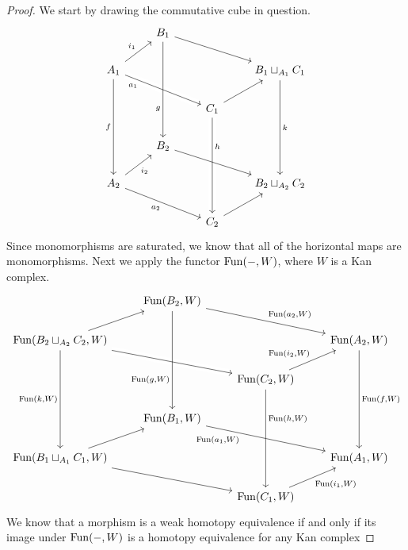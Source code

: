 \documentclass[a4paper,11pt,openany]{scrartcl}
\begin{document}
~\\
\begin{proof}
    We start by drawing the commutative cube in question.
    \[\begin{tikzcd}
        & {B_1} \\
        {A_1} &&& {B_1\sqcup_{A_1}C_1} \\
        && {C_1} \\
        & {B_2} \\
        {A_2} &&& {B_2\sqcup_{A_2}C_2} \\
        && {C_2}
        \arrow["h"{pos=0.3}, from=3-3, to=6-3, crossing over]
        \arrow["{a_2}"', from=5-1, to=6-3]
        \arrow[from=6-3, to=5-4]
        \arrow["{i_2}"', from=5-1, to=4-2]
        \arrow[from=4-2, to=5-4]
        \arrow["k", from=2-4, to=5-4]
        \arrow["f"', from=2-1, to=5-1]
        \arrow["{a_1}"'{pos=0.2}, from=2-1, to=3-3, crossing over]
        \arrow[from=1-2, to=2-4]
        \arrow[from=3-3, to=2-4]
        \arrow["{i_1}", from=2-1, to=1-2]
        \arrow["g"'{pos=0.7}, from=1-2, to=4-2]
    \end{tikzcd}\]
    Since monomorphisms are saturated, we know that all of the horizontal maps
    are monomorphisms. Next we apply the functor $\operatorname{Fun}(-,W)$, where $W$ is a Kan
    complex.
    \[\begin{tikzcd}
        & {\Fun(B_2,W)} \\
        {\Fun(B_2\sqcup_{A_2}C_2,W)} &&& {\Fun(A_2,W)} \\
        && {\Fun(C_2,W)} \\
        & {\Fun(B_1,W)} \\
        {\Fun(B_1\sqcup_{A_1}C_1,W)} &&& {\Fun(A_1,W)} \\
        && {\Fun(C_1,W)}
        \arrow["{\Fun(h,W)}"{pos=0.3}, from=3-3, to=6-3, crossing over]
        \arrow[from=5-1, to=6-3]
        \arrow["{\Fun(i_1,W)}"', from=6-3, to=5-4]
        \arrow[from=5-1, to=4-2]
        \arrow["{\Fun(a_1,W)}"'{pos=0.3}, from=4-2, to=5-4]
        \arrow["{\Fun(f,W)}", from=2-4, to=5-4]
        \arrow["{\Fun(k,W)}"', from=2-1, to=5-1]
        \arrow[from=2-1, to=3-3, crossing over]
        \arrow["{\Fun(a_2,W)}", from=1-2, to=2-4]
        \arrow["{\Fun(i_2,W)}", from=3-3, to=2-4]
        \arrow[from=2-1, to=1-2]
        \arrow["{\Fun(g,W)}"'{pos=0.7}, from=1-2, to=4-2]
    \end{tikzcd}\]
    We know that a morphism is a weak homotopy equivalence if and only if its
    image under $\operatorname{Fun}(-,W)$ is a homotopy equivalence for any Kan complex

\end{proof}
\end{document}
